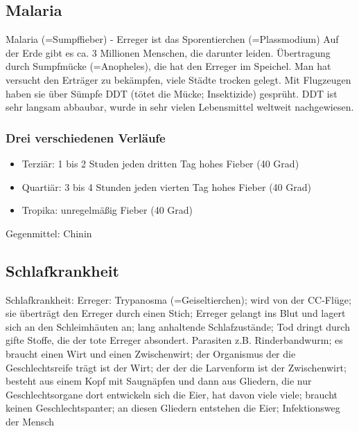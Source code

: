 \documentclass[a4paper]{article}
\begin{document}
\subsection{Malaria}
Malaria (=Sumpffieber) - Erreger ist das Sporentierchen (=Plassmodium)
Auf der Erde gibt es ca. 3 Millionen Menschen, die darunter leiden. Übertragung durch Sumpfmücke (=Anopheles), die hat den Erreger im Speichel. Man hat versucht den Erträger zu bekämpfen, viele Städte trocken gelegt. Mit Flugzeugen haben sie über Sümpfe DDT (tötet die Mücke; Insektizide) gesprüht. DDT ist sehr langsam abbaubar, wurde in sehr vielen Lebensmittel weltweit nachgewiesen.

\subsubsection{Drei verschiedenen Verläufe}

\begin{itemize}
\item Terziär: 1 bis 2 Studen jeden dritten Tag hohes Fieber (40 Grad)
\item Quartiär: 3 bis 4 Stunden jeden vierten Tag hohes Fieber (40 Grad)
\item Tropika: unregelmäßig Fieber (40 Grad)
\end{itemize}

Gegenmittel: Chinin

\subsection{Schlafkrankheit}
Schlafkrankheit: Erreger: Trypanosma (=Geiseltierchen); wird von der CC-Flüge; sie überträgt den Erreger durch einen Stich; Erreger gelangt ins Blut und lagert sich an den Schleimhäuten an; lang anhaltende Schlafzustände; Tod dringt durch gifte Stoffe, die der tote Erreger absondert.
\newline
Parasiten z.B. Rinderbandwurm; es braucht einen Wirt und einen Zwischenwirt; der Organismus der die Geschlechtsreife trägt ist der Wirt; der der die Larvenform ist der Zwischenwirt; besteht aus einem Kopf mit Saugnäpfen und dann aus Gliedern, die nur Geschlechtsorgane dort entwickeln sich die Eier, hat davon viele viele; braucht keinen Geschlechtspanter; an diesen Gliedern entstehen die Eier; Infektionsweg der Mensch 
\end{document}
